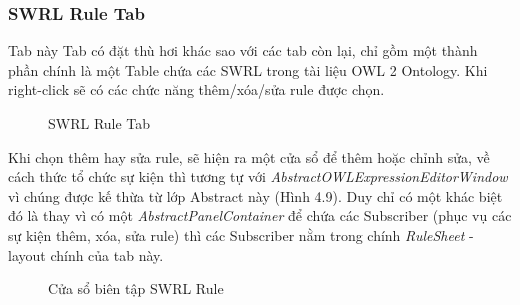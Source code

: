 \subsubsection{SWRL Rule Tab}
Tab này  Tab có đặt thù hơi khác sao với các tab còn lại, chỉ gồm một thành phần chính là một Table chứa các SWRL trong tài liệu OWL 2 Ontology. Khi right-click sẽ có các chức năng thêm/xóa/sửa rule được chọn.
\begin{figure}[h!]
	\centering
	\caption{SWRL Rule Tab\label{overflow}}
\end{figure}
Khi chọn thêm hay sửa rule, sẽ hiện ra một cửa sổ để thêm hoặc chỉnh sửa, về cách thức tổ chức sự kiện thì tương tự với \textit{AbstractOWLExpressionEditorWindow} vì chúng được kế thừa từ lớp Abstract này (Hình 4.9). Duy chỉ có một khác biệt đó là thay vì có một \textit{AbstractPanelContainer} để chứa các Subscriber (phục vụ các sự kiện thêm, xóa, sửa rule) thì các Subscriber nằm trong chính \textit{RuleSheet} - layout chính của tab này.
\begin{figure}[h!]
	\centering
	\caption{Cửa sổ biên tập SWRL Rule\label{overflow}}
\end{figure}
